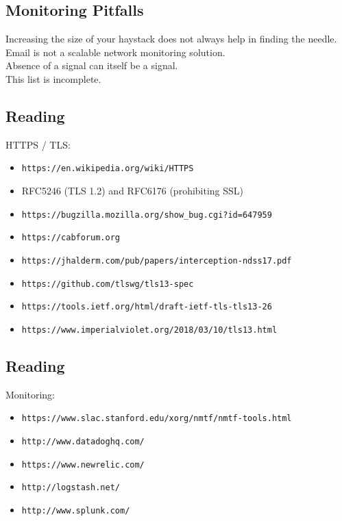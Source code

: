 \documentclass[xga]{xdvislides}
\begin{document}
\subsection{Monitoring Pitfalls}
\vspace*{\fill}
\Huge
\begin{center}
Increasing the size of your haystack does not always
help in finding the needle. \\
\vspace{.4in}
Email is not a scalable network monitoring solution. \\
\vspace{.4in}
Absence of a signal can itself be a signal. \\
\vspace{.4in}
This list is incomplete.
\end{center}
\Normalsize
\vspace*{\fill}

\subsection{Reading}
HTTPS / TLS:
\begin{itemize}
	\item {\tt https://en.wikipedia.org/wiki/HTTPS}
	\item RFC5246 (TLS 1.2) and RFC6176 (prohibiting SSL)
	\item {\tt https://bugzilla.mozilla.org/show\_bug.cgi?id=647959}
	\item {\tt https://cabforum.org}
	\item {\tt https://jhalderm.com/pub/papers/interception-ndss17.pdf}
	\item {\tt https://github.com/tlswg/tls13-spec}
	\item {\tt https://tools.ietf.org/html/draft-ietf-tls-tls13-26}
	\item {\tt https://www.imperialviolet.org/2018/03/10/tls13.html}
\end{itemize}

\subsection{Reading}

Monitoring:
\begin{itemize}
	\item {\tt https://www.slac.stanford.edu/xorg/nmtf/nmtf-tools.html}
	\item {\tt http://www.datadoghq.com/}
	\item {\tt https://www.newrelic.com/}
	\item {\tt http://logstash.net/}
	\item {\tt http://www.splunk.com/}
\end{itemize}
\end{document}
